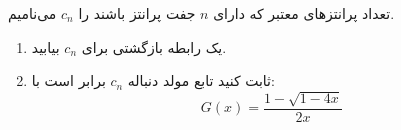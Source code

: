     \p 
تعداد پرانتزهای معتبر که دارای
$n$
جفت پرانتز باشند را
$c_n$
می‌نامیم.
\begin{enumerate}
\item
یک رابطه بازگشتی برای
$c_n$
بیابید.
\item
ثابت کنید تابع مولد دنباله
$c_n$
برابر است با:
$$G(x) = \frac{1 - \sqrt{1 - 4x}}{2x}$$
\end{enumerate}